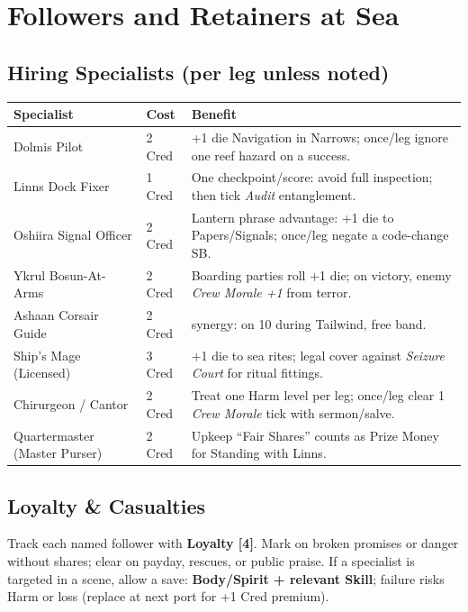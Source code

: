 \documentclass[11pt,oneside]{book}
\newcommand{\tagpill}[1]{\begingroup
  \setlength{\fboxsep}{1pt}\color{black}\fbox{\footnotesize\textsf{#1}}
\endgroup}
\begin{document}
\section{Followers and Retainers at Sea}

\subsection*{Hiring Specialists (per leg unless noted)}
\begin{tabularx}{\linewidth}{@{}p{3.6cm} p{1.5cm} X@{}}
\toprule
\textbf{Specialist} & \textbf{Cost} & \textbf{Benefit}\\
\midrule
Dolmis Pilot & 2 Cred & +1 die Navigation in Narrows; once/leg ignore one reef hazard on a success.\\
Linns Dock Fixer & 1 Cred & One checkpoint/score: avoid full inspection; then tick \textit{Audit} entanglement.\\
Oshiira Signal Officer & 2 Cred & Lantern phrase advantage: +1 die to Papers/Signals; once/leg negate a code-change SB.\\
Ykrul Bosun-At-Arms & 2 Cred & Boarding parties roll +1 die; on victory, enemy \textit{Crew Morale +1} from terror.\\
Ashaan Corsair Guide & 2 Cred & \tagpill{REED-WIND SAILS} synergy: on 10 during Tailwind, free band.\\
Ship's Mage (Licensed) & 3 Cred & +1 die to sea rites; legal cover against \textit{Seizure Court} for ritual fittings.\\
Chirurgeon / Cantor & 2 Cred & Treat one Harm level per leg; once/leg clear 1 \textit{Crew Morale} tick with sermon/salve.\\
Quartermaster (Master Purser) & 2 Cred & Upkeep ``Fair Shares'' counts as Prize Money for Standing with Linns.\\
\bottomrule
\end{tabularx}

\subsection*{Loyalty \& Casualties}
Track each named follower with \textbf{Loyalty [4]}. Mark on broken promises or danger without shares; clear on payday, rescues, or public praise. If a specialist is targeted in a scene, allow a save: \textbf{Body/Spirit + relevant Skill}; failure risks Harm or loss (replace at next port for +1 Cred premium).
\end{document}
